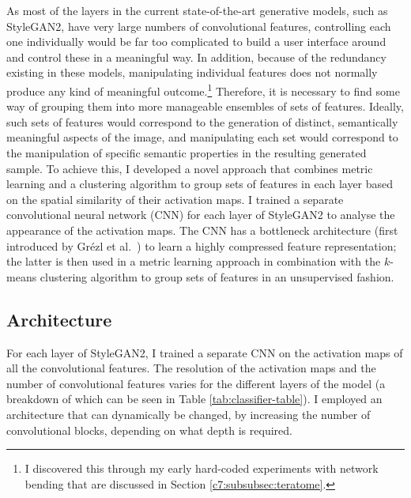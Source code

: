 As most of the layers in the current state-of-the-art generative models, such as StyleGAN2, have very large numbers of convolutional features, controlling each one individually would be far too complicated to build a user interface around and control these in a meaningful way. 
In addition, because of the redundancy existing in these models, manipulating individual features does not normally produce any kind of meaningful outcome.\footnote{I discovered this through my early hard-coded experiments with network bending that are discussed in Section \ref{c7:subsubsec:teratome}.} 
Therefore, it is necessary to find some way of grouping them into more manageable ensembles of sets of features. 
Ideally, such sets of features would correspond to the generation of distinct, semantically meaningful aspects of the image, and manipulating each set would correspond to the manipulation of specific semantic properties in the resulting generated sample. 
To achieve this, I developed a novel approach that combines metric learning and a clustering algorithm to group sets of features in each layer based on the spatial similarity of their activation maps. 
I trained a separate convolutional neural network (CNN) for each layer of StyleGAN2 to analyse the appearance of the activation maps. 
The CNN has a bottleneck architecture (first introduced by Gr{\'e}zl et al.~\citep{grezl2007probabilistic}) to learn a highly compressed feature representation; the latter is then used in a metric learning approach in combination with the $k$-means clustering algorithm \citep{lloyd1982least, celebi2013comparative} to group sets of features in an unsupervised fashion. 

\subsection{Architecture}

For each layer of StyleGAN2, I trained a separate CNN on the activation maps of all the convolutional features. 
The resolution of the activation maps and the number of convolutional features varies for the different layers of the model (a breakdown of which can be seen in Table \ref{tab:classifier-table}).
I employed an architecture that can dynamically be changed, by increasing the number of convolutional blocks, depending on what depth is required. 

